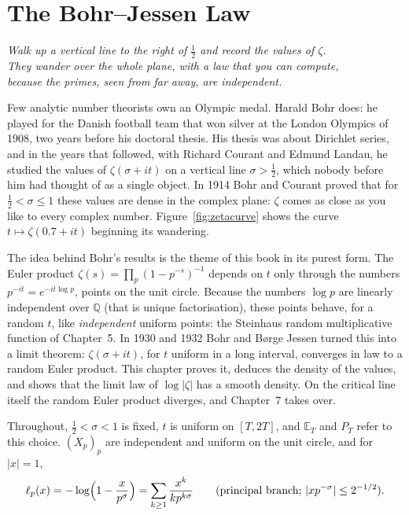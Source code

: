 \chapter{The Bohr--Jessen Law}\label{ch:bohrjessen}
\begin{center}\itshape
Walk up a vertical line to the right of $\frac12$ and record the values of $\zeta$.\\
They wander over the whole plane, with a law that you can compute,\\
because the primes, seen from far away, are independent.
\end{center}

Few analytic number theorists own an Olympic medal. Harald Bohr does: he played for the Danish football team that won silver at the London Olympics of 1908, two years before his doctoral thesis. His thesis was about Dirichlet series, and in the years that followed, with Richard Courant and Edmund Landau, he studied the values of $\zeta(\sigma+it)$ on a vertical line $\sigma>\frac12$, which nobody before him had thought of as a single object. In 1914 Bohr and Courant proved that for $\frac12<\sigma\le1$ these values are dense in the complex plane: $\zeta$ comes as close as you like to every complex number. Figure~\ref{fig:zetacurve} shows the curve $t\mapsto\zeta(0.7+it)$ beginning its wandering.

The idea behind Bohr's results is the theme of this book in its purest form. The Euler product $\zeta(s)=\prod_p(1-p^{-s})^{-1}$ depends on $t$ only through the numbers $p^{-it}=e^{-it\log p}$, points on the unit circle. Because the numbers $\log p$ are linearly independent over $\mathbb Q$ (that is unique factorisation), these points behave, for a random $t$, like \emph{independent} uniform points: the Steinhaus random multiplicative function of Chapter~5. In 1930 and 1932 Bohr and Børge Jessen turned this into a limit theorem: $\zeta(\sigma+it)$, for $t$ uniform in a long interval, converges in law to a random Euler product. This chapter proves it, deduces the density of the values, and shows that the limit law of $\log|\zeta|$ has a smooth density. On the critical line itself the random Euler product diverges, and Chapter~7 takes over.

Throughout, $\frac12<\sigma<1$ is fixed, $t$ is uniform on $[T,2T]$, and $\mathbb E_T$ and $P_T$ refer to this choice. $(X_p)_p$ are independent and uniform on the unit circle, and for $|x|=1$,
\[
\ell_p(x)=-\log\Bigl(1-\frac x{p^\sigma}\Bigr)=\sum_{k\ge1}\frac{x^k}{kp^{k\sigma}}\qquad(\text{principal branch; }|xp^{-\sigma}|\le2^{-1/2}).
\]

